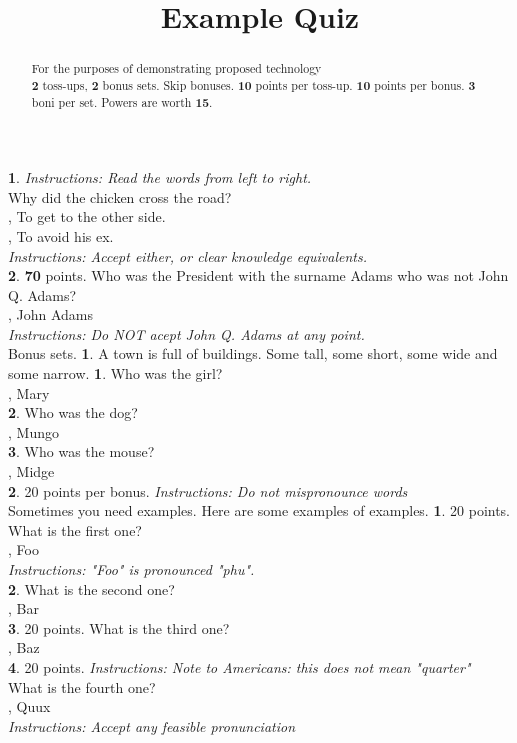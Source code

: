 \documentclass[12pt]{article}
\title{Example Quiz}
\begin{document}
\begin{abstract}
For the purposes of demonstrating proposed technology \\
\textbf{2} toss-ups, \textbf{2} bonus sets.  Skip bonuses.  \textbf{10} points per toss-up.  \textbf{10} points per bonus.  \textbf{3} boni per set.  Powers are worth \textbf{15}.\\
\end{abstract}
\maketitle
\textbf{1}.
\textit{Instructions: Read the words from left to right. }\\
 Why did the chicken cross the road? \\
, To get to the other side. \\, To avoid his ex. \\
\textit{Instructions: Accept either, or clear knowledge equivalents. }\\
\textbf{2}. \textbf{70} points.
 Who was the President  with the surname Adams  who was not John Q. Adams? \\
, John Adams \\
\textit{Instructions: Do NOT acept John Q. Adams at any point. }\\
Bonus sets.
\textbf{1}.
A town is full of buildings.  Some tall, some short, some wide and some narrow.
\textbf{1}.
 Who was the girl? \\
, Mary \\
\textbf{2}.
 Who was the dog? \\
, Mungo \\
\textbf{3}.
 Who was the mouse? \\
, Midge \\
\textbf{2}.
20 points per bonus.
\textit{Instructions: Do not mispronounce words }\\
Sometimes you need examples.  Here are some examples of examples.
\textbf{1}. 20 points.
 What is the first one? \\
, Foo \\
\textit{Instructions: "Foo" is pronounced "phu". }\\
\textbf{2}.
 What is the second one? \\
, Bar \\
\textbf{3}. 20 points.
 What is the third one? \\
, Baz \\
\textbf{4}. 20 points.
\textit{Instructions: Note to Americans: this does not mean "quarter" }\\
 What is the fourth one? \\
, Quux \\
\textit{Instructions: Accept any feasible pronunciation }\\
\end{document}
